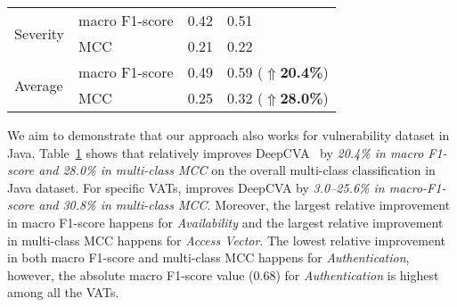 \begin{table}[t]
\begin{center}
\begin{tabular}{l|p{1.9cm}<{\centering}|p{1.5cm}<{\centering}|p{1.5cm}<{\centering}}
			\hline
			\multirow{2}{*}{Severity}        & macro F1-score                             &   0.42         & 0.51\\
			\cline{2-4}
			& MCC                                 &   0.21         & 0.22\\
			\hline
			\hline
			\multirow{2}{*}{Average}         & macro F1-score                             &    0.49        & 0.59 ($\Uparrow${\bf 20.4\%})\\
			\cline{2-4}
			& MCC                                 & 0.25           & 0.32 ($\Uparrow${\bf 28.0\%})\\
			\hline
		\end{tabular}
		\label{rq2_results}
	\end{center}
\end{table}

We aim to demonstrate that our approach also works for vulnerability
dataset in Java. Table~\ref{rq2_results} shows that {\tool} relatively
improves DeepCVA~\cite{deepCVA-ase21} by {\em 20.4\% in macro F1-score
and 28.0\% in multi-class MCC} on the overall multi-class
classification in Java dataset. For specific VATs, {\tool} improves
DeepCVA by {\em 3.0--25.6\% in macro-F1-score and 30.8\% in
multi-class MCC}. Moreover, the largest relative improvement in macro
F1-score happens for {\em Availability} and the largest relative
improvement in multi-class MCC happens for {\em Access Vector}. The
lowest relative improvement in both macro F1-score and multi-class MCC
happens for {\em Authentication}, however, the absolute macro F1-score
value (0.68) for {\em Authentication} is highest among all the VATs.

